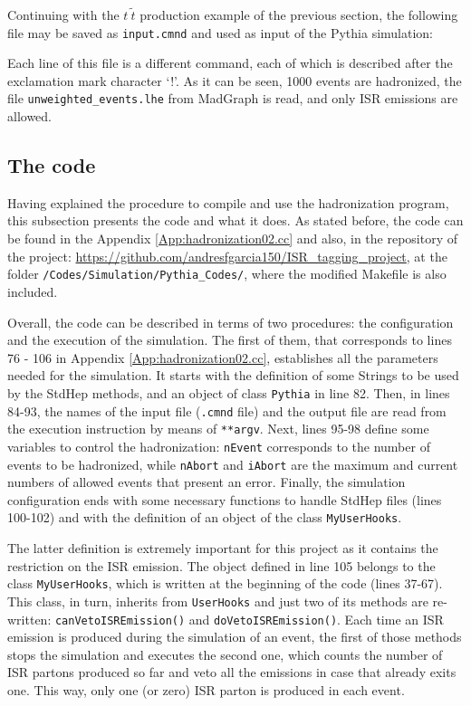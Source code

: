 \documentclass[12pt, oneside]{book}              %
\begin{document}
Continuing with the $ t\ \tilde{t} $ production example of the previous
section, the following file may be saved as \texttt{input.cmnd} and
used as input of the Pythia simulation:



Each line of this file is a different command, each of which is described after
the exclamation mark character \textquoteleft!'. As it can be seen, 1000 
events are hadronized, the file \texttt{unweighted\_events.lhe} from 
MadGraph is read, and only ISR emissions are allowed.

\subsection{The code}\label{sub:Pythia_code}

Having explained the procedure to compile and use the hadronization program, 
this subsection presents the code and what it does. As stated before, the code
can be found in the Appendix \ref{App:hadronization02.cc} and also, in the 
repository of the project: \url{https://github.com/andresfgarcia150/ISR_tagging_project},
at the folder \texttt{/Codes/Simulation/Pythia\_Codes/}, where the modified
Makefile is also included.

Overall, the code can be described in terms of two procedures: the configuration
and the execution of the simulation. The first of them, that corresponds to
lines 76 - 106 in Appendix \ref{App:hadronization02.cc}, establishes all the
parameters needed for the simulation. It starts with the definition of some Strings
to be used by the StdHep methods, and an object of class \texttt{Pythia} in line 82.
Then, in lines 84-93, the names of the input file (\texttt{.cmnd} file) and the 
output file are read from the execution instruction by means of \texttt{**argv}.
Next, lines 95-98 define some variables to control the hadronization: 
\texttt{nEvent} corresponds to the number of events to be hadronized, while
\texttt{nAbort} and \texttt{iAbort} are the maximum and current numbers of 
allowed events that present an error. Finally, the simulation configuration 
ends with some necessary functions to handle StdHep files (lines 100-102) and
with the definition of an object of the class \texttt{MyUserHooks}.

The latter definition is extremely important for this project as it contains
the restriction on the ISR emission. The object defined in line 105 belongs to
the class \texttt{MyUserHooks}, which is written at the beginning of the code 
(lines 37-67). This class, in turn, inherits from \texttt{UserHooks} and just
two of its methods are re-written: \texttt{canVetoISREmission()} and 
\texttt{doVetoISREmission()}. Each time an ISR emission is produced during
the simulation of an event, the first of those methods stops the simulation
and executes the second one, which counts the number of ISR partons produced
so far and veto all the emissions in case that already exits one. This way, 
only one (or zero) ISR parton is produced in each event. 
\end{document}
